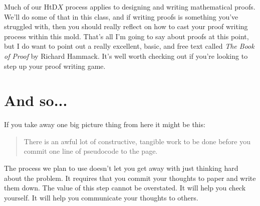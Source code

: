\documentclass[]{tufte-handout}
\begin{document}
Much of our HtD$X$ process applies to designing and writing mathematical proofs. We'll do some of that in this class, and if writing proofs is something you've struggled with, then you should really reflect on how to cast your proof writing process within this mold.  That's all I'm going to say about proofs at this point, but I do want to point out a really excellent, basic, and free text called \textit{The Book of Proof} by Richard Hammack.  It's well worth checking out if you're looking to step up your proof writing game. 

\section{And so...}

If you take away one big picture thing from here it might be this:

\begin{quote}
There is an awful lot of constructive, tangible work to be done before you commit one line of pseudocode to the page. 
\end{quote}

The process we plan to use doesn't let you get away with just thinking hard about the problem. It requires that you commit your thoughts to paper and write them down.  The value of this step cannot be overstated. It will help you check yourself. It will help you communicate your thoughts to others.  
\end{document}
